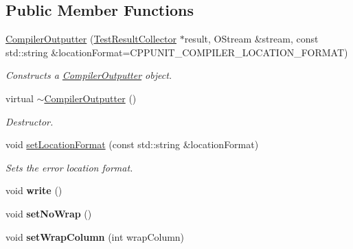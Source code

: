 \subsection*{Public Member Functions}
\begin{DoxyCompactItemize}
\item 
\hyperlink{class_compiler_outputter_a8dd6679e24c18b3ca54a4266d9d1b812}{Compiler\+Outputter} (\hyperlink{class_test_result_collector}{Test\+Result\+Collector} $\ast$result, O\+Stream \&stream, const std\+::string \&location\+Format=C\+P\+P\+U\+N\+I\+T\+\_\+\+C\+O\+M\+P\+I\+L\+E\+R\+\_\+\+L\+O\+C\+A\+T\+I\+O\+N\+\_\+\+F\+O\+R\+M\+AT)
\begin{DoxyCompactList}\small\item\em Constructs a \hyperlink{class_compiler_outputter}{Compiler\+Outputter} object. \end{DoxyCompactList}\item 
virtual \hyperlink{class_compiler_outputter_ac74daaf4b355850c5e70b743aac2df82}{$\sim$\+Compiler\+Outputter} ()\hypertarget{class_compiler_outputter_ac74daaf4b355850c5e70b743aac2df82}{}\label{class_compiler_outputter_ac74daaf4b355850c5e70b743aac2df82}

\begin{DoxyCompactList}\small\item\em Destructor. \end{DoxyCompactList}\item 
void \hyperlink{class_compiler_outputter_a0d9e67c7bdcb443b0b2754d61a10790c}{set\+Location\+Format} (const std\+::string \&location\+Format)
\begin{DoxyCompactList}\small\item\em Sets the error location format. \end{DoxyCompactList}\item 
void {\bfseries write} ()\hypertarget{class_compiler_outputter_a55ca2189956b9b52bdfb1802bf8da445}{}\label{class_compiler_outputter_a55ca2189956b9b52bdfb1802bf8da445}

\item 
void {\bfseries set\+No\+Wrap} ()\hypertarget{class_compiler_outputter_aaa1d8281f8973552a8e9a4568b7d90b4}{}\label{class_compiler_outputter_aaa1d8281f8973552a8e9a4568b7d90b4}

\item 
void {\bfseries set\+Wrap\+Column} (int wrap\+Column)\hypertarget{class_compiler_outputter_ab3559c2aaa88cbccb7c3823b3dd4d247}{}\label{class_compiler_outputter_ab3559c2aaa88cbccb7c3823b3dd4d247}


\end{DoxyCompactItemize}
